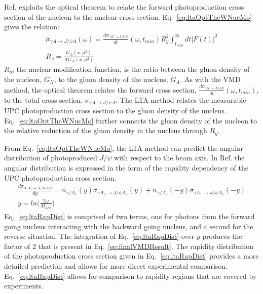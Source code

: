    Ref. \cite{lta2011.09} exploits the optical theorem to relate the forward 
     photoproduction cross section of the nucleon to the nuclear cross section. 
   Eq.~\ref{eq:ltaOptTheWNucMo} gives the relation:
   \begin{eqnarray} \label{eq:ltaOptTheWNucMo}
     \sigma_{\gamma A\rightarrow J/\psi A}(\omega)=
     \frac{d\sigma_{\gamma N\rightarrow J/\psi N}}{dt}(\omega,t_{min})
     R_{g}^{2}\int_{t_{min}}^{\infty}dt|F(t)|^{2} \\
     R_{g}=\frac{G_{A}(x,\mu^{2})}{AG_{N}(x,\mu^{2})} \nonumber 
   \end{eqnarray} 
   $R_{g}$, the nuclear modification function, is the ratio between the gluon 
     density of the nucleon, $G_{N}$, to the gluon density of the nucleus, 
     $G_{A}$.
   As with the VMD method, the optical theorem relates the forward cross 
     section, $\frac{d\sigma_{\gamma N\rightarrow J/\psi N}}{dt}(\omega,t_{min})$,
     to the total cross section, $\sigma_{\gamma A\rightarrow J/\psi A}$. 
   The LTA method relates the measurable UPC photoproduction cross section 
     to the gluon density of the nucleus.  
   Eq.~\ref{eq:ltaOptTheWNucMo} further connects the gluon density of the 
     nucleon to the relative reduction of the gluon density in the nucleus 
     through $R_{g}$.

   From Eq.~\ref{eq:ltaOptTheWNucMo}, the LTA method can predict the angular 
     distribution of photoproduced $J/\psi$ with respect to the beam axis. 
   In Ref. \cite{lta2012.03} the angular distribution is expressed in the form 
     of the rapidity dependency of the UPC photoproduction cross section. 
   \begin{eqnarray} \label{eq:ltaRapDist}
     \frac{d\sigma_{A_{1}A_{2}\rightarrow A_{1}A_{2}J/\psi}}{dy}=
       n_{\gamma/A_{1}}(y)\sigma_{\gamma A_{2}\rightarrow J/\psi A_{2}}(y)
       +n_{\gamma/A_{2}}(-y)\sigma_{\gamma A_{1}\rightarrow J/\psi A_{1}}(-y) \\
       y=ln\Big(\frac{2\omega}{M_{J/\psi}}\Big) \nonumber
   \end{eqnarray}
   Eq.~\ref{eq:ltaRapDist} is comprised of two terms, one for photons from the
     forward going nucleus interacting with the backward going nucleus, and 
     a second for the reverse situation. 
   The integration of Eq.~\ref{eq:ltaRapDist} over $y$ produces the factor of 2 
     that is present in Eq.~\ref{eq:finalVMDResult}.
   The rapidity distribution of the photoproduction cross section given in 
     Eq.~\ref{eq:ltaRapDist} provides a more detailed prediction and allows for
     more direct experimental comparison.
   Eq.~\ref{eq:ltaRapDist} allows for comparison to rapidity regions that are 
     covered by experiments.
  
